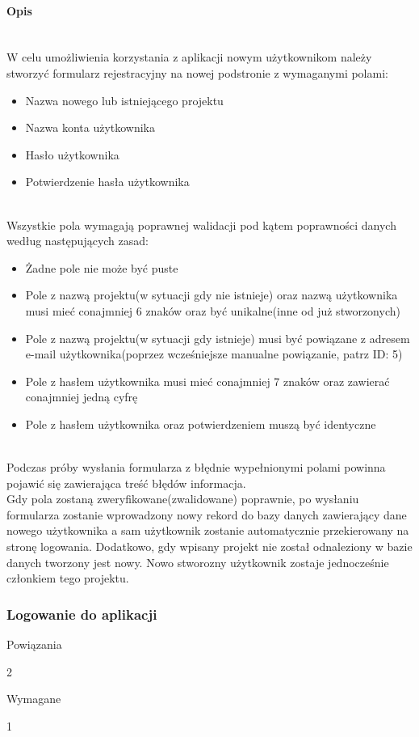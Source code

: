 \documentclass[eng,printmode]{mgr}
\begin{document}
\paragraph{Opis}\ \\
W celu umożliwienia korzystania z aplikacji nowym użytkownikom należy stworzyć formularz rejestracyjny na nowej podstronie z wymaganymi polami:
\begin{itemize}
	\item Nazwa nowego lub istniejącego projektu
	\item Nazwa konta użytkownika
	\item Hasło użytkownika
	\item Potwierdzenie hasła użytkownika
\end{itemize}
\ \\
Wszystkie pola wymagają poprawnej walidacji pod kątem poprawności danych według następujących zasad:
\begin{itemize}
	\item Żadne pole nie może być puste
	\item Pole z nazwą projektu(w sytuacji gdy nie istnieje) oraz nazwą użytkownika musi mieć conajmniej 6 znaków oraz być unikalne(inne od już stworzonych)
	\item Pole z nazwą projektu(w sytuacji gdy istnieje) musi być powiązane z adresem e-mail użytkownika(poprzez wcześniejsze manualne powiązanie, patrz ID: 5)
	\item Pole z hasłem użytkownika musi mieć conajmniej 7 znaków oraz zawierać conajmniej jedną cyfrę
	\item Pole z hasłem użytkownika oraz potwierdzeniem muszą być identyczne
\end{itemize}
\ \\
Podczas próby wysłania formularza z błędnie wypełnionymi polami powinna pojawić się zawierająca treść błędów informacja.
\\
Gdy pola zostaną zweryfikowane(zwalidowane) poprawnie, po wysłaniu formularza zostanie wprowadzony nowy rekord do bazy danych zawierający dane nowego użytkownika a sam użytkownik zostanie automatycznie przekierowany na stronę logowania. Dodatkowo, gdy wpisany projekt nie został odnaleziony w bazie danych tworzony jest nowy. Nowo stworozny użytkownik zostaje jednocześnie członkiem tego projektu.
\newpage

\subsubsection{Logowanie do aplikacji}
\begin{labeling}{Powiązania}
\item [ID:] 2
\item [Typ:] Wymagane
\item [Powiązania] 1
\end{labeling}
\end{document}

